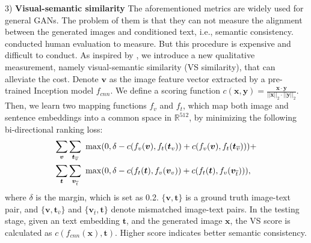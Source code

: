 \documentclass[10pt,twocolumn,letterpaper]{article}
\begin{document}
3) \textbf{Visual-semantic similarity} The aforementioned metrics are widely used for general GANs. The problem of them is that they can not measure the alignment between the generated images and conditioned text, i.e., semantic consistency. \cite{han2017stackgan} conducted human evaluation to measure. But this procedure is expensive and difficult to conduct.
As inspired by \cite{vsemb}, we introduce a new qualitative measurement, namely visual-semantic similarity (VS similarity), that can alleviate the cost. 
Denote $\bm{v}$ as the image feature vector extracted by a pre-trained Inception model $f_{cnn}$.
We define a scoring function $c(\bm{x}, \bm{y})=\frac{\bm{x}\cdot \bm{y}}{||\bm{x}||_2\cdot ||\bm{y}||_2}$. 
Then, we learn two mapping functions $f_v$ and $f_t$, which map both image and sentence embeddings into a common space in $\mathbb{R}^{512}$, by minimizing the following bi-directional ranking loss:
\begin{equation}\vspace{-.2cm}
\begin{split}
  \sum_{ \bm{v} }\sum_{ \bm{t}_{\overline{v}} }~ &\max( 0, \delta  - c(f_v(\bm{v}), f_t( \bm{t}_{{v}}) )+ c(f_v(\bm{v}), f_t( \bm{t}_{\overline{v}}) )     ) +\\
   \sum_{ \bm{t} }\sum_{ \bm{v}_{\overline{t}} }~ &\max( 0,  \delta  - c(f_t(\bm{t}), f_v( \bm{v}_{{v}} )) +  c(f_t(\bm{t}), f_v( \bm{v}_{\overline{t}} ))  ),
\end{split}
\vspace{-.2cm}
\end{equation}
where $\delta$ is the margin, which is set as 0.2. $\{\bm{v}, \bm{t}\}$ is a ground truth image-text pair, and $\{\bm v, \bm t_{\overline{v}} \}$ and $\{ \bm v_{\overline{t}}, \bm{t} \}$ denote mismatched image-text pairs. In the testing stage, given an text embedding $\bm{t}$, and the generated image $\bm{x}$, the VS score is calculated as $c(f_{cnn}(\bm{x}), \bm{t})$. Higher score indicates better semantic consistency.
\end{document}
